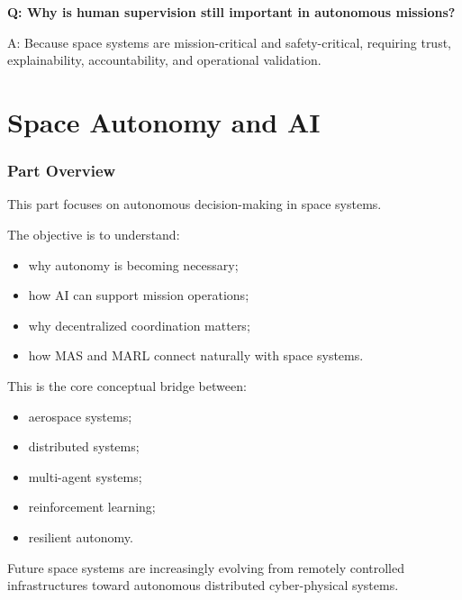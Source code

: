 \documentclass[10pt,a4paper,twocolumn]{article}
\begin{document}
\begin{questionbox}
    \textbf{Q: Why is human supervision still important in autonomous missions?}

    A: Because space systems are mission-critical and safety-critical, requiring trust, explainability, accountability, and operational validation.
\end{questionbox}


\part{Space Autonomy and AI}


\section*{Part Overview}

This part focuses on autonomous decision-making in space systems.

The objective is to understand:
\begin{itemize}
    \item why autonomy is becoming necessary;
    \item how AI can support mission operations;
    \item why decentralized coordination matters;
    \item how MAS and MARL connect naturally with space systems.
\end{itemize}

This is the core conceptual bridge between:
\begin{itemize}
    \item aerospace systems;
    \item distributed systems;
    \item multi-agent systems;
    \item reinforcement learning;
    \item resilient autonomy.
\end{itemize}

\begin{keybox}
    Future space systems are increasingly evolving from remotely controlled infrastructures toward autonomous distributed cyber-physical systems.
\end{keybox}
\end{document}
